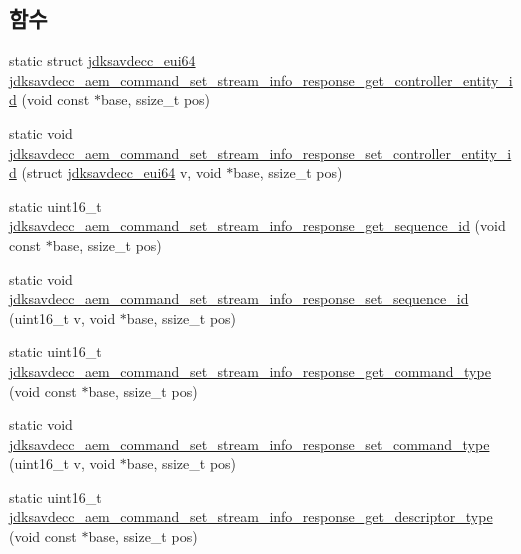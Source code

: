 \subsection*{함수}
\begin{DoxyCompactItemize}
\item 
static struct \hyperlink{structjdksavdecc__eui64}{jdksavdecc\+\_\+eui64} \hyperlink{group__command__set__stream__info__response_ga7059f2b48ecc33b99a4985f37afacf58}{jdksavdecc\+\_\+aem\+\_\+command\+\_\+set\+\_\+stream\+\_\+info\+\_\+response\+\_\+get\+\_\+controller\+\_\+entity\+\_\+id} (void const $\ast$base, ssize\+\_\+t pos)
\item 
static void \hyperlink{group__command__set__stream__info__response_ga78fcdbeeb7b9f9ed95de1b7a5a3ac20a}{jdksavdecc\+\_\+aem\+\_\+command\+\_\+set\+\_\+stream\+\_\+info\+\_\+response\+\_\+set\+\_\+controller\+\_\+entity\+\_\+id} (struct \hyperlink{structjdksavdecc__eui64}{jdksavdecc\+\_\+eui64} v, void $\ast$base, ssize\+\_\+t pos)
\item 
static uint16\+\_\+t \hyperlink{group__command__set__stream__info__response_ga2fa89f02748539c48ade91646c5b01c4}{jdksavdecc\+\_\+aem\+\_\+command\+\_\+set\+\_\+stream\+\_\+info\+\_\+response\+\_\+get\+\_\+sequence\+\_\+id} (void const $\ast$base, ssize\+\_\+t pos)
\item 
static void \hyperlink{group__command__set__stream__info__response_ga558f979260f7bd251755f2260305b8a5}{jdksavdecc\+\_\+aem\+\_\+command\+\_\+set\+\_\+stream\+\_\+info\+\_\+response\+\_\+set\+\_\+sequence\+\_\+id} (uint16\+\_\+t v, void $\ast$base, ssize\+\_\+t pos)
\item 
static uint16\+\_\+t \hyperlink{group__command__set__stream__info__response_ga29c692ffe2b3dedeea0122360bd8a522}{jdksavdecc\+\_\+aem\+\_\+command\+\_\+set\+\_\+stream\+\_\+info\+\_\+response\+\_\+get\+\_\+command\+\_\+type} (void const $\ast$base, ssize\+\_\+t pos)
\item 
static void \hyperlink{group__command__set__stream__info__response_ga24588d3992f71ddd4a633ef09c8b0feb}{jdksavdecc\+\_\+aem\+\_\+command\+\_\+set\+\_\+stream\+\_\+info\+\_\+response\+\_\+set\+\_\+command\+\_\+type} (uint16\+\_\+t v, void $\ast$base, ssize\+\_\+t pos)
\item 
static uint16\+\_\+t \hyperlink{group__command__set__stream__info__response_ga2af288f63567f10108700f344f7ed7c2}{jdksavdecc\+\_\+aem\+\_\+command\+\_\+set\+\_\+stream\+\_\+info\+\_\+response\+\_\+get\+\_\+descriptor\+\_\+type} (void const $\ast$base, ssize\+\_\+t pos)
\item 

\end{DoxyCompactItemize}
